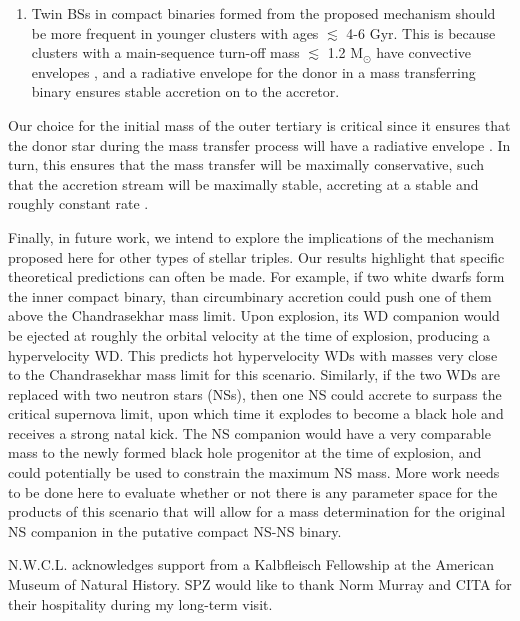 \documentclass{aastex62}
\begin{document}
\begin{enumerate}
\item Twin BSs in compact binaries formed from the proposed mechanism should be more frequent in younger clusters with ages $\lesssim$ 4-6 Gyr.  This is because clusters with a main-sequence turn-off mass $\lesssim$ 1.2 M$_{\odot}$ have convective envelopes \citep[e.g.][]{iben91,maedoer09}, and a radiative envelope for the donor in a mass transferring binary ensures stable accretion on to the accretor.

\end{enumerate}

Our choice for the initial mass of the outer tertiary is critical since it
ensures that the donor star during the mass transfer process will have
a radiative envelope \citep[e.g.][]{maeder09}.  In turn, this ensures
that the mass transfer will be maximally conservative, such that the
accretion stream will be maximally stable, accreting at a stable and
roughly constant rate \citep[e.g.][]{iben91}.

Finally, in future work, we intend to explore the implications of the mechanism proposed here for other types of stellar triples.  Our results highlight that specific theoretical predictions can often be made.  For example, if two white dwarfs form the inner compact binary, than circumbinary accretion could push one of them above the Chandrasekhar mass limit.  Upon explosion, its WD companion would be ejected at roughly the orbital velocity at the time of explosion, producing a hypervelocity WD.  This predicts hot hypervelocity WDs with masses very close to the Chandrasekhar mass limit for this scenario.  Similarly, if the two WDs are replaced with two neutron stars (NSs), then one NS could accrete to surpass the critical supernova limit, upon which time it explodes to become a black hole and receives a strong natal kick.  The NS companion would have a very comparable mass to the newly formed black hole progenitor at the time of explosion, and could potentially be used to constrain the maximum NS mass.  More work needs to be done here to evaluate whether or not there is any parameter space for the products of this scenario that will allow for a mass determination for the original NS companion in the putative compact NS-NS binary.

\acknowledgments

N.W.C.L. acknowledges support from a Kalbfleisch Fellowship at the
American Museum of Natural History.  SPZ would like to thank Norm
Murray and CITA for their hospitality during my long-term visit.





%
% 
%      
\end{document}
